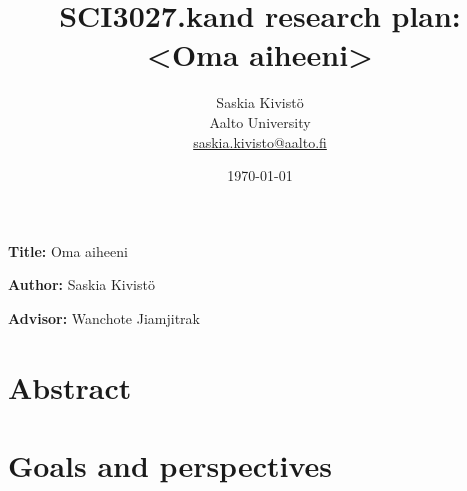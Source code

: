 \documentclass[12pt,a4paper,english,oneside]{article}
\begin{document}

\title{SCI3027.kand research plan:\\[5mm]
<Oma aiheeni>}

\author{Saskia Kivistö\\
Aalto University\\
\url{saskia.kivisto@aalto.fi}}

\date{\today}

\maketitle


\begin{comment}
Tämä pohja on lukuisia kandidaatintöitä ohjanneen Vesa Hirvisalon
käyttämä sabluuna tutkimussuunnitelmaksi.  Annettua otsikointia ja
järjestystä voi käyttää apuna oman suunnitelman laatimisessa.
Tärkeintä on tuottaa työkalu sinun ja ohjaajan väliseen
kommunikointiin aiheen selventämisessä. Lisäksi aikatauluksen
miettiminen heti alussa on tarpeellista.

Tämän lähdetiedoston nimi on \verb!tutkimussuunnitelma.tex! ja tästä
saa PDF-tiedoston joko \verb!make tutkimussuunnitelma.pdf! tai
\verb!pdflatex tutkimussuunnitelma.tex! (ja jos lähteitä, niin lisäksi
\verb!bibtex tutkimussuunnitelma!).  

\vspace{10mm}
\end{comment}

%

\textbf{Title:} Oma aiheeni

\textbf{Author:} Saskia Kivistö

\textbf{Advisor:} Wanchote Jiamjitrak


\section{Abstract}


\section{Goals and perspectives}
\end{document}
